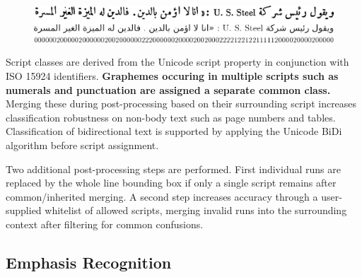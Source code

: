 \begin{figure}
	\includegraphics[width=\linewidth]{transcription.png}
	\centering
	\label{fig:transcription}
\end{figure}

Script classes are derived from the Unicode script property in conjunction with
ISO 15924 identifiers. \textbf{Graphemes occuring in multiple scripts such as
numerals and punctuation are assigned a separate common class.} Merging these
during post-processing based on their surrounding script increases
classification robustness on non-body text such as page numbers and tables.
Classification of bidirectional text is supported by applying the Unicode BiDi
algorithm before script assignment.

Two additional post-processing steps are performed. First individual runs are
replaced by the whole line bounding box if only a single script remains after
common/inherited merging. A second step increases accuracy through a
user-supplied whitelist of allowed scripts, merging invalid runs into the
surrounding context after filtering for common confusions.

\subsection*{Emphasis Recognition}
\label{sec:emph}

